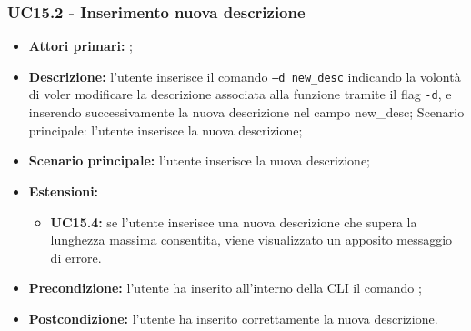 \subsubsection{UC15.2 - Inserimento nuova descrizione}
\begin{itemize}
	\item \textbf{Attori primari:} \us{};
	\item \textbf{Descrizione:} l'utente inserisce il comando \pedit{} \texttt{–d new\_desc} indicando la volontà di voler modificare la descrizione associata alla funzione tramite il flag \texttt{-d}, e inserendo successivamente la nuova descrizione nel campo new\_desc;
	Scenario principale: l’utente inserisce la nuova descrizione;   
	\item \textbf{Scenario principale:} l’utente inserisce la nuova descrizione;  
	\item \textbf{Estensioni:} 
	\begin{itemize}
		\item \textbf{UC15.4:} se l’utente inserisce una nuova descrizione che supera la lunghezza massima consentita, viene visualizzato un apposito messaggio di errore. 
	\end{itemize}
	\item \textbf{Precondizione:} l’utente ha inserito all’interno della CLI il comando \edit{};
	\item \textbf{Postcondizione:} l’utente ha inserito correttamente la nuova descrizione.
\end{itemize}